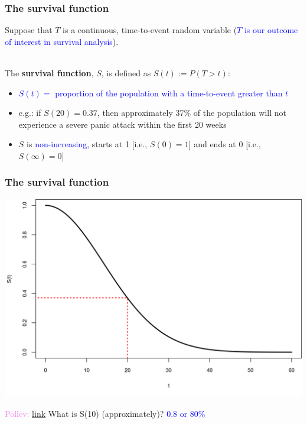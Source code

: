 \documentclass[10pt,t]{beamer}
\begin{document}
\begin{frame}
\frametitle{The survival function}
Suppose that $T$ is a continuous, time-to-event random variable (\textcolor{blue}{$T$ is our outcome of interest in survival analysis}).
\\ ~\ 

The \textbf{survival function}, $S$, is defined as $S(t) := P(T > t)$:  

\medskip

\begin{itemize}
\item \textcolor{blue}{$S(t) = $ proportion of the population with a time-to-event greater than $t$}  

\medskip

\item e.g.: if $S(20) = 0.37$, then approximately 37\% of the population will not experience a severe panic attack within the first 20 weeks  

\medskip

\item $S$ is \textcolor{blue}{non-increasing}, starts at 1 [i.e., $S(0) = 1$] and ends at 0 [i.e., $S(\infty) = 0$]
\end{itemize}
\end{frame}

\begin{frame}
\frametitle{The survival function}
\includegraphics[height=0.8\textheight]{figs/survival_function.png}

\textcolor{violet}{Pollev: \href{https://PollEv.com/free_text_polls/f3xByyuUfSQMWmCKlR3j0/respond}{link}} What is S(10) (approximately)? \pause \textcolor{blue}{0.8 or 80\%}

\end{frame}
\end{document}
